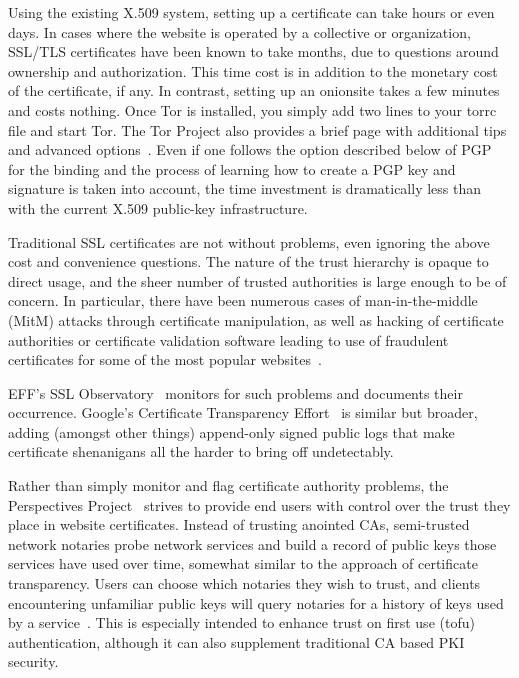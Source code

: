 \documentclass[10pt, conference, compsocconf]{styles/IEEEtran}
\begin{document}
Using the existing X.509 system, setting up a certificate can take
hours or even days. In cases where the website is operated by a
collective or organization, SSL/TLS certificates have been known to
take months, due to questions around ownership and authorization.
This time cost is in addition to the monetary cost of the certificate, if any.
In contrast, setting up an onionsite takes a few minutes and costs
nothing. Once Tor is installed, you simply add two lines to your torrc file 
and start Tor. The Tor Project also provides a brief page with
additional tips and advanced options~\cite{hs-config}.  Even if
one follows the option described below of PGP for the binding and the process
of learning how to create a PGP key and signature is taken into
account, the time investment is dramatically less than with the
current X.509 public-key infrastructure.


Traditional SSL certificates are not without problems, even ignoring
the above cost and convenience questions. The nature of the trust
hierarchy is opaque to direct usage, and the sheer number of trusted
authorities is large enough to be of concern. In particular, there
have been numerous cases of man-in-the-middle (MitM) attacks through
certificate manipulation, as well as hacking of certificate
authorities or certificate validation software leading to use of
fraudulent certificates for some of the most popular
websites~\cite{forged-ssl-oakland14}.


EFF's SSL Observatory~\cite{ssl-observatory} 
monitors for such problems and documents their occurrence.
Google's Certificate Transparency
Effort~\cite{certificate-transparency} is similar but broader,
adding (amongst other things) append-only signed public
logs that make certificate shenanigans all the harder to bring off
undetectably.

Rather than simply monitor and flag certificate authority
problems, the Perspectives Project~\cite{perspectives} strives to
provide end users with control over the trust they place in website
certificates. Instead of trusting anointed CAs, semi-trusted network
notaries probe network services and build a record of public keys
those services have used over time, somewhat similar to the approach
of certificate transparency. Users can choose which notaries they wish
to trust, and clients encountering unfamiliar public keys will query
notaries for a history of keys used by a
service~\cite{perspectives-paper}. This is especially intended to
enhance trust on first use (tofu) authentication, although it can also
supplement traditional CA based PKI security. 
\end{document}
